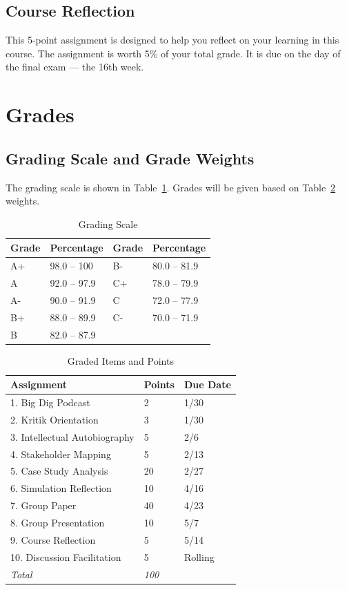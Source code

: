 \documentclass[12pt, letterpaper]{article}
\begin{document}
\subsection*{Course Reflection}

This 5-point assignment is designed to help you reflect on your learning in this course. The assignment is worth 5\% of your total grade. It is due on the day of the final exam --- the 16th week.


\section*{Grades}

\subsection*{Grading Scale and Grade Weights}  
The grading scale is shown in Table~\ref{tab:grading-scale}. Grades will be given based on Table~\ref{tab:grade-weights} weights.

\begin{table}[ht]
\centering
\caption{Grading Scale}
\begin{tabular}{llll}
\toprule
\textbf{Grade} & \textbf{Percentage} & \textbf{Grade} & \textbf{Percentage} \\
\midrule
A+ & 98.0 – 100 & B- & 80.0 – 81.9\\
A & 92.0 – 97.9 & C+ & 78.0 – 79.9\\
A- & 90.0 – 91.9 & C & 72.0 – 77.9\\
B+ & 88.0 – 89.9 & C- & 70.0 – 71.9\\
B & 82.0 – 87.9 & & \\
\bottomrule
\end{tabular}
\label{tab:grading-scale}
\end{table}

\begin{table}[ht]
    \centering
    \caption{Graded Items and Points}
    \begin{tabular}{lll}
        \toprule
    \textbf{Assignment} & \textbf{Points} & \textbf{Due Date}\\
    \midrule
    1. Big Dig Podcast & 2 & 1/30 \\
    2. Kritik Orientation & 3 & 1/30 \\
    3. Intellectual Autobiography & 5 & 2/6 \\
    4. Stakeholder Mapping & 5 & 2/13 \\
    5. Case Study Analysis & 20 & 2/27\\
    6. Simulation Reflection & 10 & 4/16 \\
    7. Group Paper & 40 & 4/23 \\
    8. Group Presentation & 10 & 5/7\\
    9. Course Reflection & 5 & 5/14 \\ 
    10. Discussion Facilitation & 5 & Rolling \\\bottomrule
    \emph{Total} & \emph{100} \\
    \end{tabular}
    \label{tab:grade-weights}
    \end{table}
\end{document}
